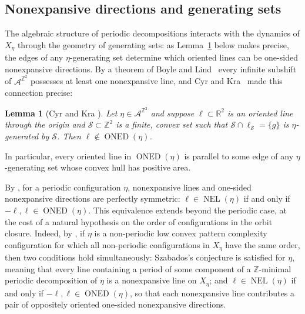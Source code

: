 \documentclass[12pt]{amsart}
\numberwithin{equation}{section}
\newtheorem{lemma}[theorem]{Lemma}
\DeclareMathOperator{\nexpl}{NEL}
\DeclareMathOperator{\nexpd}{ONED}
\newcommand{\bb}[1]{\mathbb{#1}}
\begin{document}
\subsection{Nonexpansive directions and generating sets} \label{subsec:nonexp}

The algebraic structure of periodic decompositions interacts with the dynamics of $ X_\eta $ through the geometry of generating sets: as Lemma~\ref{lem_genset_noedge_expas} below makes precise, the edges of any $\eta$-generating set determine which oriented lines can be one-sided nonexpansive directions. By a theorem of Boyle and Lind~\cite{BoyleLind97} every infinite
subshift of $\mathcal A^{\mathbb Z^2}$ possesses at least one nonexpansive line, and
Cyr and Kra~\cite{CyrKra15} made this connection precise: 

\begin{lemma}[Cyr and Kra \cite{CyrKra15}]\label{lem_genset_noedge_expas}
Let $\eta \in \mathcal{A}^{\bb{Z}^2}$ and suppose $\pmb{\ell} \subset \bb{R}^2$ is an oriented line through the ori\-gin and $\mathcal{S} \subset \bb{Z}^2$ is a finite, convex set such that $\mathcal{S} \cap \pmb{\ell}_{\mathcal{S}} = \{g\}$ is $\eta$-generated by $\mathcal{S}$. Then $\pmb{\ell} \not\in \nexpd(\eta)$.
\end{lemma}

In particular, every oriented line in $\nexpd(\eta)$ is parallel to some edge of any $\eta$-generating set whose convex hull has positive area.

By \cite[Proposition~1.3]{Colle23}, for a periodic configuration $\eta$, nonexpansive lines and one-sided nonexpansive directions are perfectly symmetric: $\ell\in\nexpl(\eta)$ if and only if
$-\pmb{\ell},\pmb{\ell} \in \nexpd(\eta)$. This equivalence extends beyond the periodic case, at the cost of a natural hypothesis on the order of configurations in the orbit closure. Indeed, by \cite[Theorem~1.10]{Colle23}, if $\eta$ is a non-periodic low convex pattern complexity configuration for which all non-periodic configurations in $ X_\eta $ have the same order, then two conditions hold simultaneously: Szabados's 
conjecture is satisfied for $\eta$, meaning that every line  
containing a period of some component of a $\mathbb Z$-minimal periodic decomposition of $ \eta $ is a nonexpansive line on $ X_\eta $; and $ \ell \in \nexpl(\eta) $ if and only if $-\pmb{\ell}, \pmb{\ell} \in 
\nexpd(\eta) $, so that each nonexpansive line contributes a pair of oppositely oriented one-sided nonexpansive directions.
\end{document}
